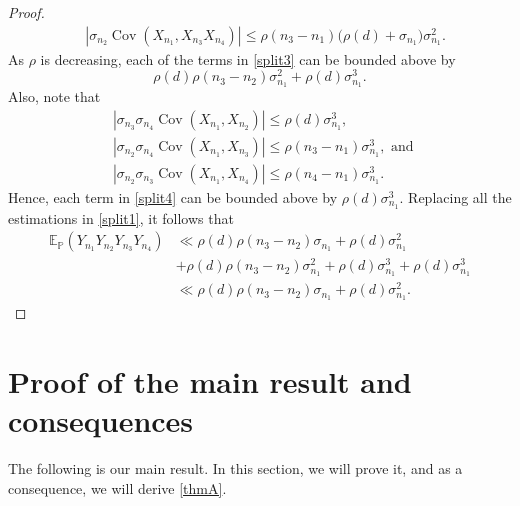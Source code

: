 \documentclass[11pt]{amsart}
\numberwithin{equation}{section}
\theoremstyle{definition}
\theoremstyle{plain}
\newcommand{\Cov}{\operatorname{Cov}}
\begin{document}
\begin{proof}
\begin{equation}
\begin{split}
    &|\sigma_{n_2}\Cov(X_{n_1},X_{n_3}X_{n_4})|\leq \rho(n_3-n_1)\Big(\rho(d)+\sigma_{n_1}\Big)\sigma_{n_1}^2.\label{split3} 
\end{split}
\end{equation}
As $\rho$ is decreasing, each of the terms in \eqref{split3} can be bounded above by $$\rho(d)\rho(n_3-n_2)\sigma_{n_1}^2+\rho(d)\sigma_{n_1}^3.$$
Also, note that
\begin{equation}
\begin{split}
    &|\sigma_{n_3}\sigma_{n_4}\Cov(X_{n_1},X_{n_2})|\leq \rho(d)\sigma_{n_1}^3,\\
    &|\sigma_{n_2}\sigma_{n_4}\Cov(X_{n_1},X_{n_3})|\leq \rho(n_3-n_1)\sigma_{n_1}^3,\text{ and }\\
    &|\sigma_{n_2}\sigma_{n_3}\Cov(X_{n_1},X_{n_4})|\leq \rho(n_4-n_1)\sigma_{n_1}^3. \label{split4} 
\end{split}
\end{equation}
Hence, each term in \eqref{split4} can be bounded above by $\rho(d)\sigma_{n_1}^3.$
Replacing all the estimations in \eqref{split1}, it follows that
\begin{align*}
    \mathbb{E}_{\mathbb{P}}\left( Y_{n_1} Y_{n_2} Y_{n_3} Y_{n_4} \right)&\ll \rho(d)\rho(n_3-n_2)\sigma_{n_1}+\rho(d)\sigma_{n_1}^2\\
    &+\rho(d)\rho(n_3-n_2)\sigma_{n_1}^2+\rho(d)\sigma_{n_1}^3+\rho(d)\sigma_{n_1}^3\\
    &\ll \rho(d)\rho(n_3-n_2)\sigma_{n_1}+\rho(d)\sigma_{n_1}^2.
\end{align*}\end{proof}


\section{Proof of the main result and consequences}
The following is our main result. In this section, we will prove it, and as a consequence, we will derive \cref{thmA}. 
\end{document}
